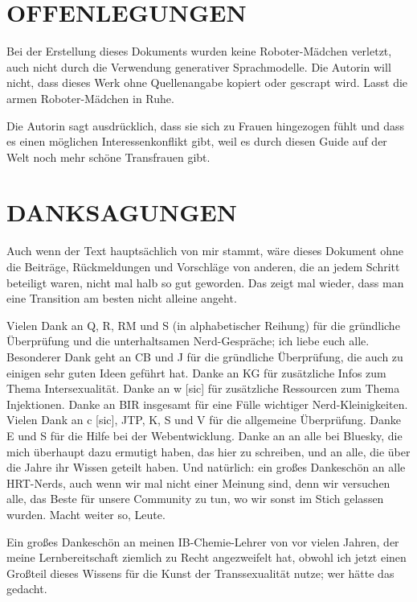 \documentclass{article}
\begin{document}
{{{												

\section*{OFFENLEGUNGEN}

Bei der Erstellung dieses Dokuments wurden keine Roboter-Mädchen verletzt, auch nicht durch die Verwendung generativer Sprachmodelle. Die Autorin will nicht, dass dieses Werk ohne Quellenangabe kopiert oder gescrapt wird. Lasst die armen Roboter-Mädchen in Ruhe.

Die Autorin sagt ausdrücklich, dass sie sich zu Frauen hingezogen fühlt und dass es einen möglichen Interessenkonflikt gibt, weil es durch diesen Guide auf der Welt noch mehr schöne Transfrauen gibt.

 

\section*{DANKSAGUNGEN}

Auch wenn der Text hauptsächlich von mir stammt, wäre dieses Dokument ohne die Beiträge, Rückmeldungen und Vorschläge von anderen, die an jedem Schritt beteiligt waren, nicht mal halb so gut geworden. Das zeigt mal wieder, dass man eine Transition  am besten nicht alleine angeht.

Vielen Dank an Q, R, RM und S (in alphabetischer Reihung) für die gründliche Überprüfung und die unterhaltsamen Nerd-Gespräche; ich liebe euch alle. Besonderer Dank geht an CB und J für die gründliche Überprüfung, die auch zu einigen sehr guten Ideen geführt hat. Danke an KG für zusätzliche Infos zum Thema Intersexualität. Danke an w [sic] für zusätzliche Ressourcen zum Thema Injektionen. Danke an BIR insgesamt für eine Fülle wichtiger Nerd-Kleinigkeiten. Vielen Dank an c [sic], JTP, K, S und V für die allgemeine Überprüfung. Danke E und S für die Hilfe bei der Webentwicklung. Danke an an alle bei Bluesky, die mich überhaupt dazu ermutigt haben, das hier zu schreiben, und an alle, die über die Jahre ihr Wissen geteilt haben. Und natürlich: ein großes Dankeschön an alle HRT-Nerds, auch wenn wir mal nicht einer Meinung sind, denn wir versuchen alle, das Beste für unsere Community zu tun, wo wir sonst im Stich gelassen wurden. Macht weiter so, Leute.

Ein großes Dankeschön an meinen IB-Chemie-Lehrer von vor vielen Jahren, der meine Lernbereitschaft ziemlich zu Recht angezweifelt hat, obwohl ich jetzt einen Großteil dieses Wissens für die Kunst der Transsexualität nutze; wer hätte das gedacht.

}}}
\end{document}
